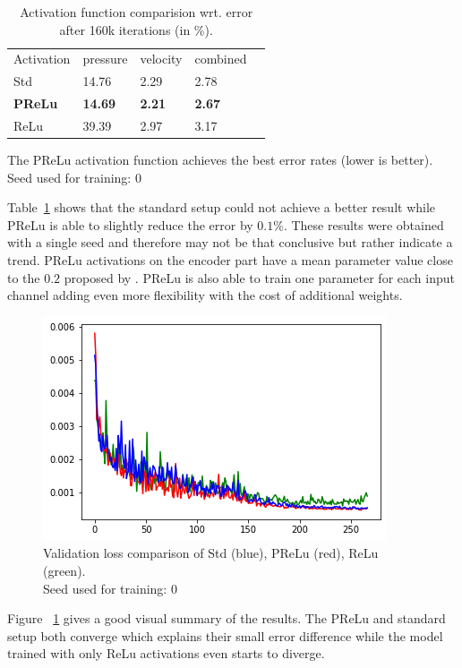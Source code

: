 \documentclass[acmtog]{techreportacmart}
\begin{document}
\begin{table}[h]
\caption{Activation function comparision wrt. error after 160k iterations (in \%).}
\label{tab:two}
\begin{center}
\begin{tabular}{l|l|l|l|l}
  \toprule
  Activation   & pressure   &	velocity    & combined \\
  Std	 & 14.76	  & 2.29		& 2.78   \\
  \bf PReLu	 & \bf 14.69	  & \bf 2.21		& \bf 2.67	   \\
  ReLu   & 39.39	  & 2.97		& 3.17	  \\
  \bottomrule
\end{tabular}
\end{center}
\bigskip\centering
\footnotesize The PReLu activation function achieves  
the best error rates (lower is better). \\
Seed used for training: $0$
\end{table}%

Table~\ref{tab:two} shows that the standard setup could not achieve a better result while PReLu 
is able to slightly reduce the error by $0.1\%$. These results were obtained with a single seed and therefore 
may not be that conclusive but rather indicate a trend. PReLu activations on the encoder part have 
a mean parameter value close to the $0.2$ proposed by \cite{Thuerey20}. PReLu is also able to train 
one parameter for each input channel adding even more flexibility with the cost of additional weights. 

\begin{figure}[h]
  \includegraphics[width=.4\textwidth]{figures/val_loss}
	\caption{Validation loss comparison of Std (blue), PReLu (red), ReLu (green). \\
	Seed used for training: $0$}
  \label{fig:val}
\end{figure}

Figure ~\ref{fig:val} gives a good visual summary of the results.
The PReLu and standard setup both converge which explains their small error difference while the model
trained with only ReLu activations even starts to diverge.
\end{document}
